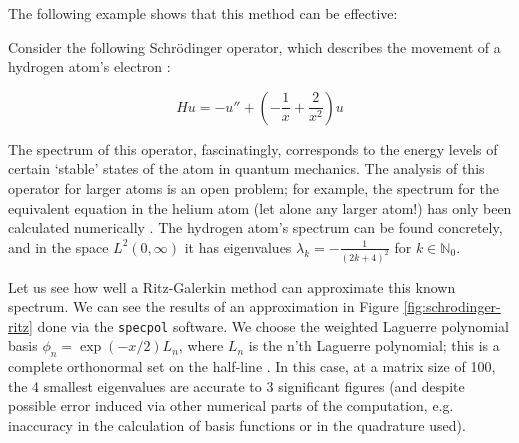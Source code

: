 \documentclass[../main.tex]{subfiles}
\begin{document}
The following example shows that this method can be effective:

\begin{example}
\label{ex:schrodinger-ritz}
Consider the following Schr\"odinger operator, which describes the movement of a
hydrogen atom's electron
\cite{pryce1993numerical}:

$$Hu = -u'' + (-\frac{1}{x} + \frac{2}{x^2})u$$
\end{example}

The spectrum of this operator, fascinatingly, corresponds to the energy levels
of certain `stable' states of the atom in quantum mechanics. The analysis of
this operator for larger atoms is an open problem; for example,
the spectrum for the equivalent equation in the helium atom (let alone any
larger atom!) has only been calculated numerically \cite{davies1995spectral}.
The hydrogen atom's spectrum can be found concretely, and in the space $L^2(0,
\infty)$ it has eigenvalues $\lambda_k = -\frac{1}{(2k + 4)^2}$ for $k \in
\mathbb{N}_0$.

Let us see how well a Ritz-Galerkin method can approximate this known spectrum.
We can see the results of an approximation in Figure \ref{fig:schrodinger-ritz}
done via the \texttt{specpol} software. We choose the weighted Laguerre
polynomial basis $\phi_n = \exp(-x/2)L_n$, where $L_n$ is the n'th Laguerre
polynomial; this is a complete orthonormal set on the half-line
\cite{szego1975orthogonal}. In this case, at a matrix size of 100, the 4
smallest eigenvalues are accurate to 3 significant figures (and despite possible
error induced via other numerical parts of the computation, e.g. inaccuracy in
the calculation of basis functions or in the quadrature used).
\end{document}
